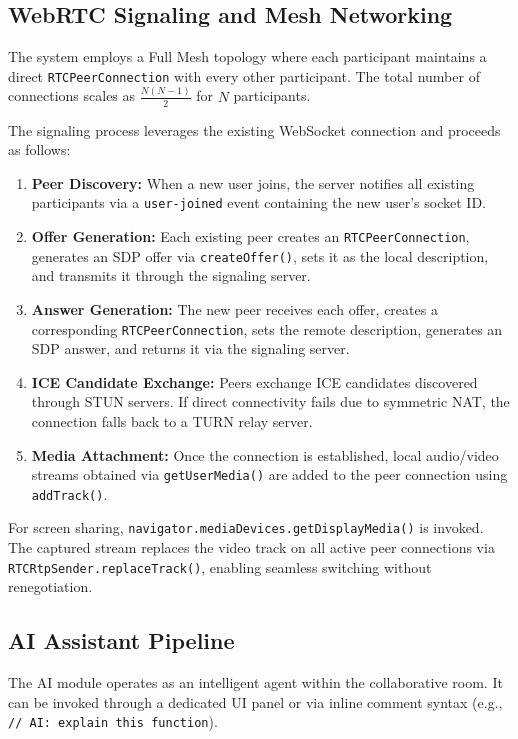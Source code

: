 \documentclass[conference]{IEEEtran}
\begin{document}
\subsection{WebRTC Signaling and Mesh Networking}
The system employs a Full Mesh topology where each participant maintains a direct \texttt{RTCPeerConnection} with every other participant. The total number of connections scales as $\frac{N(N-1)}{2}$ for $N$ participants.

The signaling process leverages the existing WebSocket connection and proceeds as follows:
\begin{enumerate}
    \item \textbf{Peer Discovery:} When a new user joins, the server notifies all existing participants via a \texttt{user-joined} event containing the new user's socket ID.
    \item \textbf{Offer Generation:} Each existing peer creates an \texttt{RTCPeerConnection}, generates an SDP offer via \texttt{createOffer()}, sets it as the local description, and transmits it through the signaling server.
    \item \textbf{Answer Generation:} The new peer receives each offer, creates a corresponding \texttt{RTCPeerConnection}, sets the remote description, generates an SDP answer, and returns it via the signaling server.
    \item \textbf{ICE Candidate Exchange:} Peers exchange ICE candidates discovered through STUN servers. If direct connectivity fails due to symmetric NAT, the connection falls back to a TURN relay server.
    \item \textbf{Media Attachment:} Once the connection is established, local audio/video streams obtained via \texttt{getUserMedia()} are added to the peer connection using \texttt{addTrack()}.
\end{enumerate}

For screen sharing, \texttt{navigator.mediaDevices.getDisplayMedia()} is invoked. The captured stream replaces the video track on all active peer connections via \texttt{RTCRtpSender.replaceTrack()}, enabling seamless switching without renegotiation.

\subsection{AI Assistant Pipeline}
The AI module operates as an intelligent agent within the collaborative room. It can be invoked through a dedicated UI panel or via inline comment syntax (e.g., \texttt{// AI: explain this function}).
\end{document}
